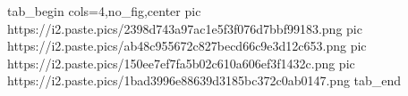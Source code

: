  
 
 
 
 

\ifcmt
  tab_begin cols=4,no_fig,center
		 pic https://i2.paste.pics/2398d743a97ac1e5f3f076d7bbf99183.png
		 pic https://i2.paste.pics/ab48c955672c827becd66c9e3d12c653.png
		 pic https://i2.paste.pics/150ee7ef7fa5b02c610a606ef3f1432c.png
		 pic https://i2.paste.pics/1bad3996e88639d3185bc372c0ab0147.png
  tab_end
\fi
